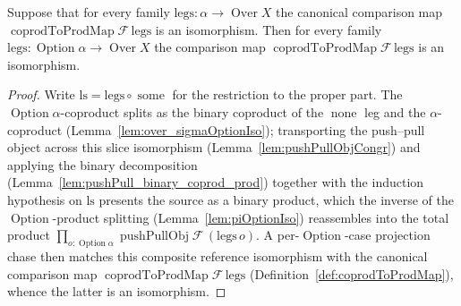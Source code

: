 \begin{lemma}
  \label{lem:coprodToProd_isIso_option}
  Suppose that for every family \(\mathrm{legs} : \alpha \to \operatorname{Over} X\) the canonical
  comparison map \(\operatorname{coprodToProdMap}\mathcal{F}\,\mathrm{legs}\) is an isomorphism. Then for
  every family \(\mathrm{legs} : \operatorname{Option}\alpha \to \operatorname{Over} X\) the comparison
  map \(\operatorname{coprodToProdMap}\mathcal{F}\,\mathrm{legs}\) is an isomorphism.
\end{lemma}
\begin{proof}
  Write \(\mathrm{ls} = \mathrm{legs} \circ \operatorname{some}\) for the restriction to the proper
  part. The \(\operatorname{Option}\alpha\)-coproduct splits as the binary coproduct of the
  \(\operatorname{none}\) leg and the \(\alpha\)-coproduct (Lemma~\ref{lem:over_sigmaOptionIso});
  transporting the push--pull object across this slice isomorphism (Lemma~\ref{lem:pushPullObjCongr})
  and applying the binary decomposition (Lemma~\ref{lem:pushPull_binary_coprod_prod}) together with the
  induction hypothesis on \(\mathrm{ls}\) presents the source as a binary product, which the inverse of
  the \(\operatorname{Option}\)-product splitting (Lemma~\ref{lem:piOptionIso}) reassembles into the
  total product \(\prod_{o : \operatorname{Option}\alpha} \operatorname{pushPullObj}\mathcal{F}\,
  (\mathrm{legs}\,o)\). A per-\(\operatorname{Option}\)-case projection chase then matches this composite
  reference isomorphism with the canonical comparison map
  \(\operatorname{coprodToProdMap}\mathcal{F}\,\mathrm{legs}\) (Definition~\ref{def:coprodToProdMap}),
  whence the latter is an isomorphism.
\end{proof}

